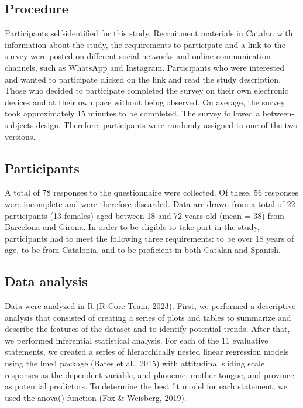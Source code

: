 \documentclass[
  a4paper,
  11pt,
  twocolumn]{article}
\begin{document}
\subsection{Procedure}

Participants self-identified for this study. Recruitment materials in
Catalan with information about the study, the requirements to
participate and a link to the survey were posted on different social
networks and online communication channels, such as WhatsApp and
Instagram. Participants who were interested and wanted to participate
clicked on the link and read the study description. Those who decided to
participate completed the survey on their own electronic devices and at
their own pace without being observed. On average, the survey took
approximately 15 minutes to be completed. The survey followed a
between-subjects design. Therefore, participants were randomly assigned
to one of the two versions.

\subsection{Participants}

A total of 78 responses to the questionnaire were collected. Of these,
56 responses were incomplete and were therefore discarded. Data are
drawn from a total of 22 participants (13 females) aged between 18 and
72 years old (mean = 38) from Barcelona and Girona. In order to be
eligible to take part in the study, participants had to meet the
following three requirements: to be over 18 years of age, to be from
Catalonia, and to be proficient in both Catalan and Spanish.

\subsection{Data analysis}

Data were analyzed in R (R Core Team, 2023). First, we performed a
descriptive analysis that consisted of creating a series of plots and
tables to summarize and describe the features of the dataset and to
identify potential trends. After that, we performed inferential
statistical analysis. For each of the 11 evaluative statements, we
created a series of hierarchically nested linear regression models using
the lme4 package (Bates et al., 2015) with attitudinal sliding scale
responses as the dependent variable, and phoneme, mother tongue, and
province as potential predictors. To determine the best fit model for
each statement, we used the anova() function (Fox \& Weisberg, 2019).
\end{document}

